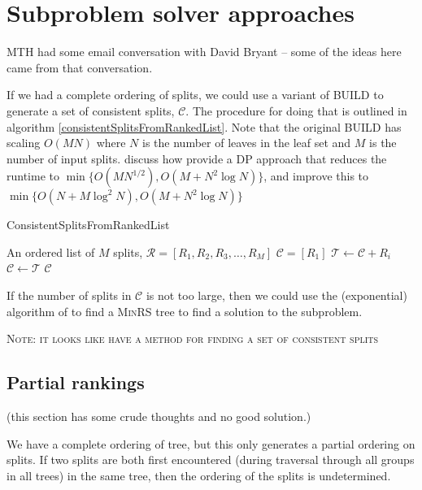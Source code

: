 \documentclass[11pt]{article}
\begin{document}
\section{Subproblem solver approaches}\label{subproblemSolver}
MTH had some email conversation with David Bryant -- some of the ideas here came from 
    that conversation.

If we had a complete ordering of splits, we could use a variant of \textsc{BUILD} \citep{AhoSSU1981}
to generate a set of consistent splits, $\mathcal{C}$.
The procedure for doing that is outlined in algorithm \ref{consistentSplitsFromRankedList}.
Note that the original BUILD has scaling $O(MN)$ where $N$ is the number of leaves in the leaf set
    and $M$ is the number of input splits.
\citet{JanssonLL2012} discuss how \citet{HenzingerKW1999} provide a DP approach that 
    reduces the runtime to $\min\{O(MN^{1/2}), O(M + N^2 \log N)\}$, and 
    \citet{HolmLT2001} improve this to $\min\{O(N + M\log^2 N), O(M + N^2 \log N)\}$

\begin{algorithm}
    \caption{ConsistentSplitsFromRankedList}\label{consistentSplitsFromRankedList}
\begin{algorithmic}
\REQUIRE An ordered list of $M$ splits, $\mathcal{R} = [R_1, R_2, R_3, \ldots, R_M]$
\STATE $\mathcal{C} = [R_1]$
    \STATE $\mathcal{T} \leftarrow \mathcal{C} + R_i$ 
        \STATE $\mathcal{C} \leftarrow \mathcal{T}$
    \ENDIF
\ENDFOR
\RETURN $\mathcal{C}$
\end{algorithmic}
\end{algorithm}


If the number of splits in $\mathcal{C}$ is not too large, then we could use the (exponential) algorithm
    of \citet{JanssonLL2012} to find a \textsc{MinRS} tree to find a solution to the subproblem.

\textsc{Note: it looks like \citet{ByrkaGJ2010} have a method for finding a set of consistent splits}

\subsection{Partial rankings}
(this section has some crude thoughts and no good solution.)

We have a complete ordering of tree, but this only generates a partial ordering on splits. 
If two splits are both first encountered (during traversal through all groups in all trees) 
    in the same tree, then the ordering of the splits is undetermined.
\end{document}
